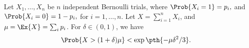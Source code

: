 \begin{lemma}
        Let $X_1, \ldots, X_n$ be $n$ independent Bernoulli trials, where
        \begin{math}
            \Prob{  X_i = 1 } =p_i,
        \end{math}
        and
        \begin{math}
            \Prob{  X_i = 0 } =1- p_i,
        \end{math}
        for $i=1,\ldots, n$.  Let $X = \sum_{i=1}^{n} X_i$, and
        $\mu = \Ex{\bigl. X} = \sum_i p_i$.  For $\delta \in (0,1)$, we have
        \begin{equation*}
            \Prob{ \bigl. X > (1+\delta)\mu } < \exp \pth{-\mu \delta^2 /
               3}.
        \end{equation*}
    \end{lemma}
